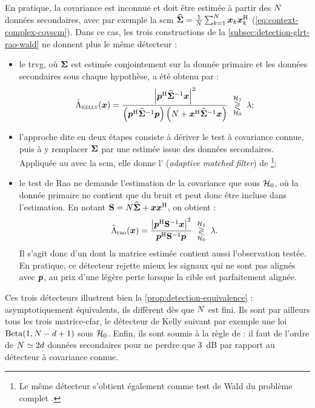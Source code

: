 En pratique, la covariance est inconnue et doit être estimée à partir des $N$ données secondaires, avec par exemple la scm $\widehat{\boldsymbol{\Sigma}}=\frac{1}{N}\sum_{k=1}^{N}\boldsymbol{x}_k\boldsymbol{x}_k^{\mathrm{H}}$ (\cref{eq:context-complex-covscm}). Dans ce cas, les trois constructions de la \cref{subsec:detection-glrt-rao-wald} ne donnent plus le même détecteur :
\begin{itemize}
  \item le trvg, où $\boldsymbol{\Sigma}$ est estimée conjointement sur la donnée primaire et les données secondaires sous chaque hypothèse, a été obtenu par  :
  \begin{equation}
    \hat{\Lambda}_{\textsc{kelly}}(\boldsymbol{x})
    =
    \frac{\left\lvert\boldsymbol{p}^{\mathrm{H}}{\widehat{\boldsymbol{\Sigma}}}^{-1}\boldsymbol{x}\right\rvert^2}
         {\left(\boldsymbol{p}^{\mathrm{H}}{\widehat{\boldsymbol{\Sigma}}}^{-1}\boldsymbol{p}\right)\left(N+\boldsymbol{x}^{\mathrm{H}}{\widehat{\boldsymbol{\Sigma}}}^{-1}\boldsymbol{x}\right)}
    \;\underset{\mathcal{H}_0}{\overset{\mathcal{H}_1}{\gtrless}}\; \lambda;
    \label{eq:detection-kelly}
  \end{equation}
  \item l'approche dite en deux étapes consiste à dériver le test à covariance connue, puis à y remplacer $\boldsymbol{\Sigma}$ par une estimée issue des données secondaires. Appliquée au  avec la scm, elle donne l' (\emph{adaptive matched filter}) de \footnote{Le même détecteur s'obtient également comme test de Wald du problème complet \cite{DeMaio2004}.};
  \item le test de Rao ne demande l'estimation de la covariance que sous $\mathcal{H}_0$, où la donnée primaire ne contient que du bruit et peut donc être incluse dans l'estimation. En notant $\mathbf{S}=N\widehat{\boldsymbol{\Sigma}}+\boldsymbol{x}\boldsymbol{x}^{\mathrm{H}}$, on obtient  :
  \begin{equation}
    \hat{\Lambda}_{\mathrm{rao}}(\boldsymbol{x})
    =
    \frac{\left\lvert\boldsymbol{p}^{\mathrm{H}}{\mathbf{S}}^{-1}\boldsymbol{x}\right\rvert^2}{\boldsymbol{p}^{\mathrm{H}}{\mathbf{S}}^{-1}\boldsymbol{p}}
    \;\underset{\mathcal{H}_0}{\overset{\mathcal{H}_1}{\gtrless}}\; \lambda.
    \label{eq:detection-rao-gaussien}
  \end{equation}
  Il s'agit donc d'un  dont la matrice estimée contient aussi l'observation testée. En pratique, ce détecteur rejette mieux les signaux qui ne sont pas alignés avec $\boldsymbol{p}$, au prix d'une légère perte lorsque la cible est parfaitement alignée.
\end{itemize}

Ces trois détecteurs illustrent bien la \cref{prop:detection-equivalence} : asymptotiquement équivalents, ils diffèrent dès que $N$ est fini. Ils sont par ailleurs tous les trois matrice-cfar, le détecteur de Kelly suivant par exemple une loi $\mathrm{Beta}(1,N-d+1)$ sous $\mathcal{H}_0$. Enfin, ils sont soumis à la règle de  : il faut de l'ordre de $N\simeq2d$ données secondaires pour ne perdre que 3~dB par rapport au détecteur à covariance connue.

